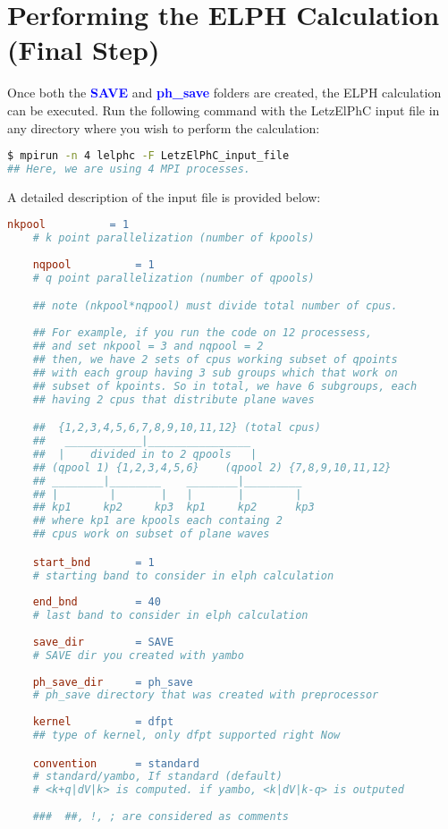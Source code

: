 \documentclass[12pt,twoside,openany]{book}
\begin{document}
\section{Performing the ELPH Calculation (Final Step)}
Once both the \textcolor{blue}{\bf{SAVE}} and \textcolor{blue}{\bf{ph\_save}} folders are created, 
the ELPH calculation can be executed. Run the following command with the LetzElPhC input file in any 
directory where you wish to perform the calculation:
\begin{lstlisting}[language=bash]
$ mpirun -n 4 lelphc -F LetzElPhC_input_file
## Here, we are using 4 MPI processes.
\end{lstlisting}
A detailed description of the input file is provided below:
\begin{lstlisting}[language=make]
    nkpool          = 1 
    # k point parallelization (number of kpools)
    
    nqpool          = 1
    # q point parallelization (number of qpools)

    ## note (nkpool*nqpool) must divide total number of cpus.
    
    ## For example, if you run the code on 12 processess, 
    ## and set nkpool = 3 and nqpool = 2
    ## then, we have 2 sets of cpus working subset of qpoints 
    ## with each group having 3 sub groups which that work on 
    ## subset of kpoints. So in total, we have 6 subgroups, each 
    ## having 2 cpus that distribute plane waves 

    ##  {1,2,3,4,5,6,7,8,9,10,11,12} (total cpus)
    ##   ____________|________________
    ##  |    divided in to 2 qpools   |
    ## (qpool 1) {1,2,3,4,5,6}    (qpool 2) {7,8,9,10,11,12}
    ## ________|________    ________|_________
    ## |        |       |   |       |        |
    ## kp1     kp2     kp3  kp1     kp2      kp3
    ## where kp1 are kpools each containg 2 
    ## cpus work on subset of plane waves

    start_bnd       = 1
    # starting band to consider in elph calculation
    
    end_bnd         = 40
    # last band to consider in elph calculation
    
    save_dir        = SAVE
    # SAVE dir you created with yambo
    
    ph_save_dir     = ph_save
    # ph_save directory that was created with preprocessor
    
    kernel          = dfpt
    ## type of kernel, only dfpt supported right Now

    convention      = standard 
    # standard/yambo, If standard (default) 
    # <k+q|dV|k> is computed. if yambo, <k|dV|k-q> is outputed 
    
    ###  ##, !, ; are considered as comments
\end{lstlisting}
\end{document}
